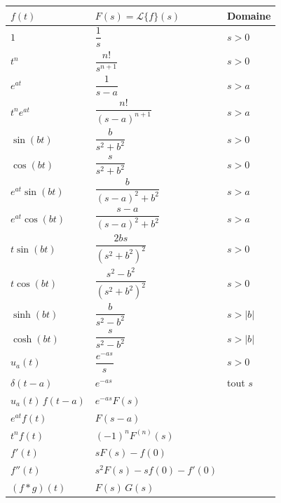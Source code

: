 \documentclass[12pt,a4paper,openany]{book}
\theoremstyle{definition}
\theoremstyle{plain}
\theoremstyle{remark}
\newcommand{\abs}[1]{\left|#1\right|}
\begin{document}
\begin{center}
\renewcommand{\arraystretch}{1.5}
\begin{tabular}{lll}
  \toprule
  $f(t)$ & $F(s)=\mathcal{L}\{f\}(s)$ & Domaine \\
  \midrule
  $1$                     & $\dfrac{1}{s}$                   & $s>0$ \\[4pt]
  $t^n$                   & $\dfrac{n!}{s^{n+1}}$            & $s>0$ \\[4pt]
  $e^{at}$                & $\dfrac{1}{s-a}$                 & $s>a$ \\[4pt]
  $t^n e^{at}$            & $\dfrac{n!}{(s-a)^{n+1}}$       & $s>a$ \\[4pt]
  $\sin(bt)$              & $\dfrac{b}{s^2+b^2}$            & $s>0$ \\[4pt]
  $\cos(bt)$              & $\dfrac{s}{s^2+b^2}$            & $s>0$ \\[4pt]
  $e^{at}\sin(bt)$        & $\dfrac{b}{(s-a)^2+b^2}$        & $s>a$ \\[4pt]
  $e^{at}\cos(bt)$        & $\dfrac{s-a}{(s-a)^2+b^2}$      & $s>a$ \\[4pt]
  $t\sin(bt)$             & $\dfrac{2bs}{(s^2+b^2)^2}$      & $s>0$ \\[4pt]
  $t\cos(bt)$             & $\dfrac{s^2-b^2}{(s^2+b^2)^2}$  & $s>0$ \\[4pt]
  $\sinh(bt)$             & $\dfrac{b}{s^2-b^2}$            & $s>\abs{b}$ \\[4pt]
  $\cosh(bt)$             & $\dfrac{s}{s^2-b^2}$            & $s>\abs{b}$ \\[4pt]
  $u_a(t)$                & $\dfrac{e^{-as}}{s}$            & $s>0$ \\[4pt]
  $\delta(t-a)$           & $e^{-as}$                       & tout $s$ \\[4pt]
  $u_a(t)\,f(t-a)$        & $e^{-as}F(s)$                   & \\[4pt]
  $e^{at}f(t)$            & $F(s-a)$                        & \\[4pt]
  $t^n f(t)$              & $(-1)^n F^{(n)}(s)$             & \\[4pt]
  $f'(t)$                 & $sF(s)-f(0)$                    & \\[4pt]
  $f''(t)$                & $s^2F(s)-sf(0)-f'(0)$           & \\[4pt]
  $(f*g)(t)$              & $F(s)\,G(s)$                    & \\
  \bottomrule
\end{tabular}
\end{center}
\end{document}
